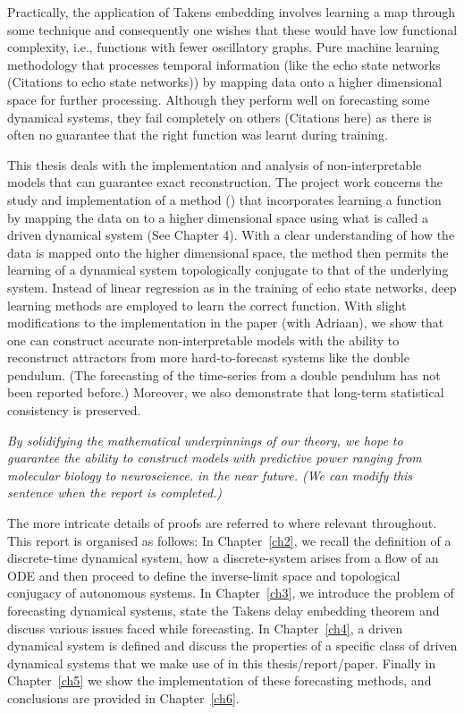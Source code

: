 \documentclass[a4paper,12pt,twoside]{report}
\begin{document}
Practically, the application of Takens embedding involves learning a map through some technique and consequently one wishes that these would have low functional complexity\cite{manjunath2021universal}, i.e., functions with fewer oscillatory graphs. Pure machine learning methodology that processes temporal information (like the echo state networks (Citations to echo state networks)) by mapping data onto a higher dimensional space for further processing. Although they perform  well on forecasting some dynamical systems, they fail completely on others (Citations here) as there is often no guarantee that the right function was learnt during training.

This thesis deals with the implementation and analysis of non-interpretable models that can guarantee exact reconstruction. The project work concerns the study and implementation of a method (\cite{manjunath2021universal}) that incorporates learning a function by mapping the data on to a higher dimensional space using what is called a driven dynamical system (See Chapter 4). With a clear understanding of how the data is mapped onto the higher dimensional space, the method then permits the learning of a dynamical system topologically conjugate to that of the underlying system. Instead of linear regression as in the training of echo state networks, deep learning methods are employed to learn the correct function. With slight modifications to the implementation in the paper (with Adriaan), we show that one can construct accurate non-interpretable models with the ability to reconstruct attractors from more hard-to-forecast systems like the double pendulum. (The forecasting of the time-series from a double pendulum has not been reported before.) Moreover, we also demonstrate that long-term statistical consistency is preserved.

\emph{By solidifying the mathematical underpinnings of our theory, we hope to guarantee the ability to construct models with predictive power ranging from molecular biology to neuroscience. in the near future. (We can modify this sentence when the report is completed.)}

The more intricate details of proofs are referred to where relevant throughout. This report is organised as follows: 
\newline In Chapter~\ref{ch2}, we recall the definition of a discrete-time dynamical system, how a discrete-system arises from a flow of an ODE and then proceed to define the inverse-limit space and topological conjugacy of autonomous systems. 
\newline In Chapter~\ref{ch3}, we introduce the problem of forecasting dynamical systems, state the Takens delay embedding theorem and discuss various issues faced while forecasting. 
\newline In Chapter~\ref{ch4}, a driven dynamical system is defined and discuss the properties of a specific class of driven dynamical systems that we make use of in this thesis/report/paper. 
\newline Finally in Chapter~\ref{ch5} we show the implementation of these forecasting methods, and conclusions are provided in Chapter~\ref{ch6}.
\end{document}
